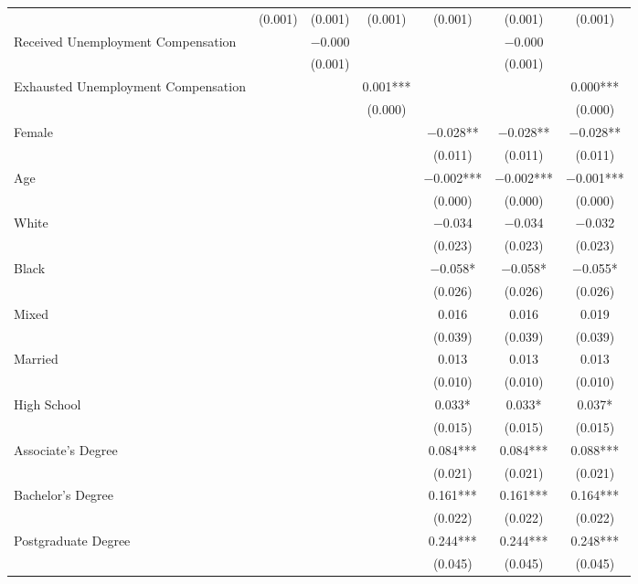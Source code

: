 \documentclass[
]{article}
\begin{document}
\begin{table}
{\begin{tabular}[t]{lcccccc}
 & (\num{0.001}) & (\num{0.001}) & (\num{0.001}) & (\num{0.001}) & (\num{0.001}) & (\num{0.001})\\
Received
Unemployment
Compensation &  & \num{-0.000} &  &  & \num{-0.000} & \\
 &  & (\num{0.001}) &  &  & (\num{0.001}) & \\
Exhausted
Unemployment
Compensation &  &  & \num{0.001}*** &  &  & \num{0.000}***\\
 &  &  & (\num{0.000}) &  &  & (\num{0.000})\\
Female &  &  &  & \num{-0.028}** & \num{-0.028}** & \num{-0.028}**\\
 &  &  &  & (\num{0.011}) & (\num{0.011}) & (\num{0.011})\\
Age &  &  &  & \num{-0.002}*** & \num{-0.002}*** & \num{-0.001}***\\
 &  &  &  & (\num{0.000}) & (\num{0.000}) & (\num{0.000})\\
White &  &  &  & \num{-0.034} & \num{-0.034} & \num{-0.032}\\
 &  &  &  & (\num{0.023}) & (\num{0.023}) & (\num{0.023})\\
Black &  &  &  & \num{-0.058}* & \num{-0.058}* & \num{-0.055}*\\
 &  &  &  & (\num{0.026}) & (\num{0.026}) & (\num{0.026})\\
Mixed &  &  &  & \num{0.016} & \num{0.016} & \num{0.019}\\
 &  &  &  & (\num{0.039}) & (\num{0.039}) & (\num{0.039})\\
Married &  &  &  & \num{0.013} & \num{0.013} & \num{0.013}\\
 &  &  &  & (\num{0.010}) & (\num{0.010}) & (\num{0.010})\\
High
School &  &  &  & \num{0.033}* & \num{0.033}* & \num{0.037}*\\
 &  &  &  & (\num{0.015}) & (\num{0.015}) & (\num{0.015})\\
Associate's
Degree &  &  &  & \num{0.084}*** & \num{0.084}*** & \num{0.088}***\\
 &  &  &  & (\num{0.021}) & (\num{0.021}) & (\num{0.021})\\
Bachelor's
Degree &  &  &  & \num{0.161}*** & \num{0.161}*** & \num{0.164}***\\
 &  &  &  & (\num{0.022}) & (\num{0.022}) & (\num{0.022})\\
Postgraduate
Degree &  &  &  & \num{0.244}*** & \num{0.244}*** & \num{0.248}***\\
 &  &  &  & (\num{0.045}) & (\num{0.045}) & (\num{0.045})\\

\end{tabular}}
\end{table}
\end{document}
